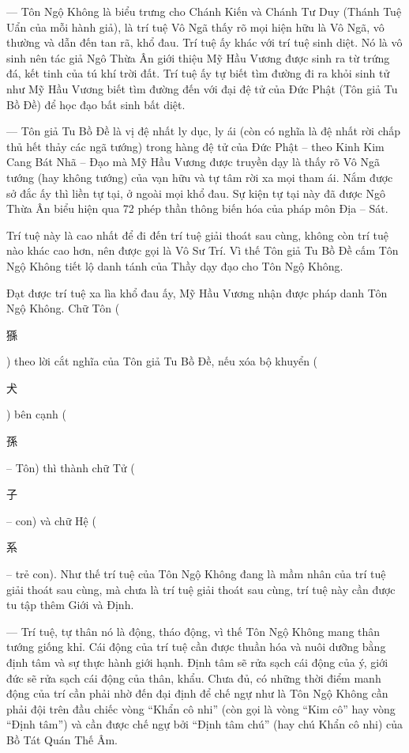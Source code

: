 --- Tôn Ngộ Không là biểu trưng cho Chánh Kiến và Chánh Tư Duy (Thánh Tuệ Uẩn của mỗi hành giả), là trí tuệ Vô Ngã thấy rõ mọi hiện hữu là Vô Ngã, vô thường và dẫn đến tan rã, khổ đau. Trí tuệ ấy khác với trí tuệ sinh diệt. Nó là vô sinh nên tác giả Ngô Thừa Ân giới thiệu Mỹ Hầu Vương được sinh ra từ trứng đá, kết tinh của tú khí trời đất. Trí tuệ ấy tự biết tìm đường đi ra khỏi sinh tử như Mỹ Hầu Vương biết tìm đường đến với đại đệ tử của Đức Phật (Tôn giả Tu Bồ Đề) để học đạo bất sinh bất diệt.

--- Tôn giả Tu Bồ Đề là vị đệ nhất ly dục, ly ái (còn có nghĩa là đệ nhất rời chấp thủ hết thảy các ngã tướng) trong hàng đệ tử của Đức Phật -- theo Kinh Kim Cang Bát Nhã -- Đạo mà Mỹ Hầu Vương được truyền dạy là thấy rõ Vô Ngã tướng (hay không tướng) của vạn hữu và tự tâm rời xa mọi tham ái. Nắm được sở đắc ấy thì liền tự tại, ở ngoài mọi khổ đau. Sự kiện tự tại này đã được Ngô Thừa Ân biểu hiện qua 72 phép thần thông biến hóa của pháp môn Địa -- Sát.

Trí tuệ này là cao nhất để đi đến trí tuệ giải thoát sau cùng, không còn trí tuệ nào khác cao hơn, nên được gọi là Vô Sư Trí. Vì thế Tôn giả Tu Bồ Đề cấm Tôn Ngộ Không tiết lộ danh tánh của Thầy dạy đạo cho Tôn Ngộ Không.

Đạt được trí tuệ xa lìa khổ đau ấy, Mỹ Hầu Vương nhận được pháp danh Tôn Ngộ Không. Chữ Tôn (\begin{CJK*}{UTF8}{bkai}猻\end{CJK*}) theo lời cắt nghĩa của Tôn giả Tu Bồ Đề, nếu xóa bộ khuyển (\begin{CJK*}{UTF8}{bkai}犬\end{CJK*}) bên cạnh (\begin{CJK*}{UTF8}{bkai}孫\end{CJK*} -- Tôn) thì thành chữ Tử (\begin{CJK*}{UTF8}{bkai}子\end{CJK*} -- con) và chữ Hệ (\begin{CJK*}{UTF8}{bkai}系\end{CJK*} -- trẻ con). Như thế trí tuệ của Tôn Ngộ Không đang là mầm nhân của trí tuệ giải thoát sau cùng, mà chưa là trí tuệ giải thoát sau cùng, trí tuệ này cần được tu tập thêm Giới và Định.

--- Trí tuệ, tự thân nó là động, tháo động, vì thế Tôn Ngộ Không mang thân tướng giống khỉ. Cái động của trí tuệ cần được thuần hóa và nuôi dưỡng bằng định tâm và sự thực hành giới hạnh. Định tâm sẽ rửa sạch cái động của ý, giới đức sẽ rửa sạch cái động của thân, khẩu. Chưa đủ, có những thời điểm manh động của trí cần phải nhờ đến đại định để chế ngự như là Tôn Ngộ Không cần phải đội trên đầu chiếc vòng ``Khẩn cô nhi'' (còn gọi là vòng ``Kim cô'' hay vòng ``Định tâm'') và cần được chế ngự bởi ``Định tâm chú'' (hay chú Khẩn cô nhi) của Bồ Tát Quán Thế Âm.

